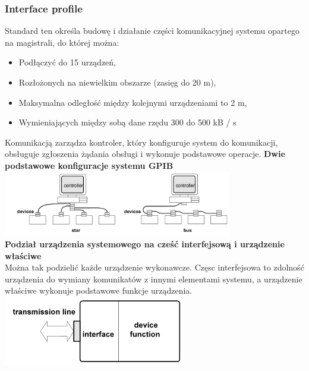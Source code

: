 \subsubsection{Interface profile}
Standard ten określa budowę i działanie części komunikacyjnej systemu opartego na magistrali, do której można:
\begin{itemize}
	\item Podłączyć do 15 urządzeń,
	\item Rozłożonych na niewielkim obszarze (zasięg do 20 m),
	\item Maksymalna odległość między kolejnymi urządzeniami to 2 m,
	\item Wymieniających między sobą dane rzędu 300 do 500 kB / s
\end{itemize}
Komunikacją zarządza kontroler, który konfiguruje system do komunikacji, obsługuje zgłoszenia żądania obsługi i wykonuje podstawowe operacje.
\textbf{Dwie podstawowe konfiguracje systemu GPIB}\\
\includegraphics[width=10cm]{./wyklady/IEEE488_SCPI_2_1.pdf}\\
\textbf{Podział urządzenia systemowego na cześć interfejsową i urządzenie właściwe}\\
Można tak podzielić każde urządzenie wykonawcze. Częsc interfejsowa to zdolność urządzenia do wymiany komunikatów z innymi elementami systemu, a urządzenie właściwe wykonuje podstawowe funkcje urządzenia.\\
\includegraphics[width=8cm]{./wyklady/IEEE488_SCPI_2_2.pdf}


